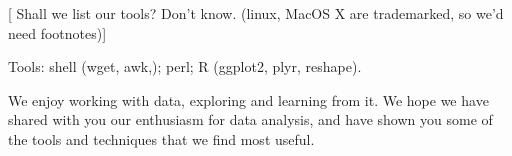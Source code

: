 \documentclass[oneside]{article}
\begin{document}
[ Shall we list our tools?  Don't know. 
(linux, MacOS X are trademarked, so we'd need footnotes)]

Tools: shell (wget, awk,); perl; R (ggplot2, plyr, reshape).



We enjoy working with data, exploring and learning from it.  We hope we have shared with you our enthusiasm for data analysis, and have shown you some of the tools and techniques that we find most useful.
\end{document}

